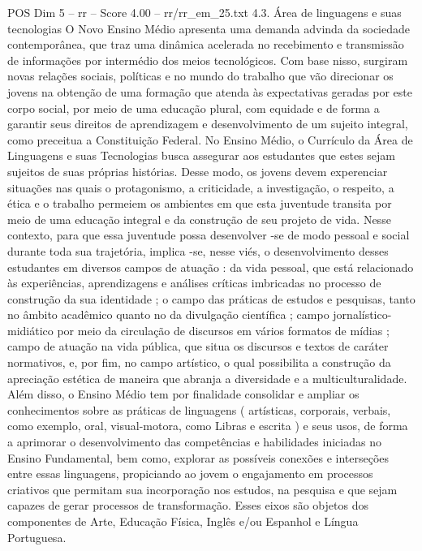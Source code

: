 \begin{textsample}{POS Dim 5 – rr – Score 4.00 – rr/rr\_em\_25.txt}  \label{ex:f5_pos_230}
4.3.
Área de linguagens e suas tecnologias O Novo Ensino Médio apresenta uma demanda advinda da sociedade contemporânea, que traz uma dinâmica acelerada no recebimento e transmissão de informações por intermédio dos meios tecnológicos.
Com base nisso, surgiram novas relações sociais, políticas e no mundo do trabalho que vão direcionar os jovens na obtenção de uma formação que atenda às expectativas geradas por este corpo social, por meio de uma educação plural, com equidade e de forma a garantir seus direitos de aprendizagem e desenvolvimento de um sujeito integral, como preceitua a Constituição Federal.
No Ensino Médio, o Currículo da Área de Linguagens e suas Tecnologias busca assegurar aos estudantes que estes sejam sujeitos de suas próprias histórias.
Desse modo, os jovens devem experenciar situações nas quais o protagonismo, a criticidade, a investigação, o respeito, a ética e o trabalho permeiem os ambientes em que esta juventude transita por meio de uma educação integral e da construção de seu projeto de vida.
Nesse contexto, para que essa juventude possa desenvolver -se de modo pessoal e social durante toda sua trajetória, implica -se, nesse viés, o desenvolvimento desses estudantes em diversos campos de atuação : da vida pessoal, que está relacionado às experiências, aprendizagens e análises críticas imbricadas no processo de construção da sua identidade ; o campo das práticas de estudos e pesquisas, tanto no âmbito acadêmico quanto no da divulgação científica ; campo jornalístico-midiático por meio da circulação de discursos em vários formatos de mídias ; campo de atuação na vida pública, que situa os discursos e textos de caráter normativos, e, por fim, no campo artístico, o qual possibilita a construção da apreciação estética de maneira que abranja a diversidade e a multiculturalidade.
Além disso, o Ensino Médio tem por finalidade consolidar e ampliar os conhecimentos sobre as práticas de linguagens ( artísticas, corporais, verbais, como exemplo, oral, visual-motora, como Libras e escrita ) e seus usos, de forma a aprimorar o desenvolvimento das competências e habilidades iniciadas no Ensino Fundamental, bem como, explorar as possíveis conexões e interseções entre essas linguagens, propiciando ao jovem o engajamento em processos criativos que permitam sua incorporação nos estudos, na pesquisa e que sejam capazes de gerar processos de transformação.
Esses eixos são objetos dos componentes de Arte, Educação Física, Inglês e/ou Espanhol e Língua Portuguesa.

\end{textsample}
